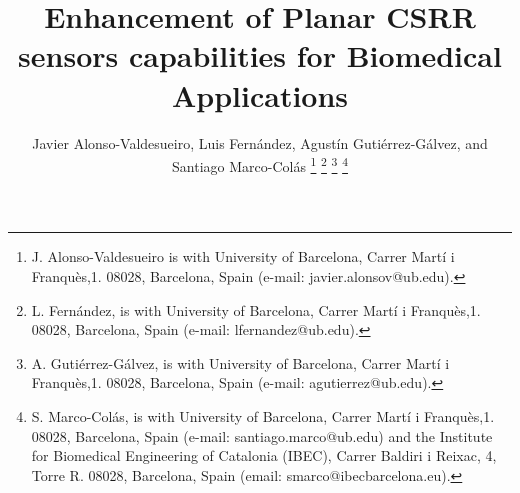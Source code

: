 \documentclass[journal,twoside,web]{ieeecolor}
\begin{document}
\title{Enhancement of Planar CSRR sensors capabilities for Biomedical Applications}
\author{Javier Alonso-Valdesueiro, Luis Fernández, Agustín Gutiérrez-Gálvez, and Santiago Marco-Colás
\thanks{J. Alonso-Valdesueiro is with University of Barcelona, Carrer Martí i Franquès,1. 08028, Barcelona, Spain (e-mail: javier.alonsov@ub.edu). }
\thanks{L. Fernández, is with University of Barcelona, Carrer Martí i Franquès,1. 08028, Barcelona, Spain (e-mail: lfernandez@ub.edu).}
\thanks{A. Gutiérrez-Gálvez, is with University of Barcelona, Carrer Martí i Franquès,1. 08028, Barcelona, Spain (e-mail: agutierrez@ub.edu).}
\thanks{S. Marco-Colás, is with University of Barcelona, Carrer Martí i Franquès,1. 08028, Barcelona, Spain (e-mail: santiago.marco@ub.edu) and the Institute for Biomedical Engineering of Catalonia (IBEC), Carrer Baldiri i Reixac, 4, Torre R. 08028, Barcelona, Spain (email: smarco@ibecbarcelona.eu).}}
\end{document}

